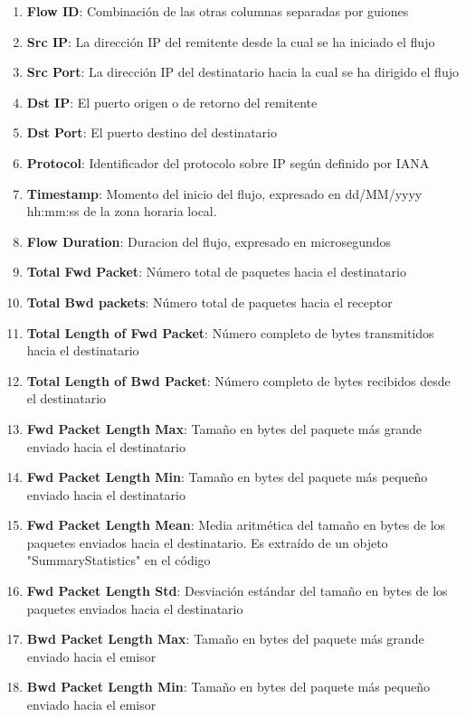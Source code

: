 \begin{enumerate}
    \item \textbf{Flow ID}: Combinación de las otras columnas separadas por guiones
    \item \textbf{Src IP}: La dirección IP del remitente desde la cual se ha iniciado el flujo
    \item \textbf{Src Port}: La dirección IP del destinatario hacia la cual se ha dirigido el flujo
    \item \textbf{Dst IP}: El puerto origen o de retorno del remitente
    \item \textbf{Dst Port}: El puerto destino del destinatario
    \item \textbf{Protocol}: Identificador del protocolo sobre IP según definido por IANA \cite{ipprotocolnumbers}
    \item \textbf{Timestamp}: Momento del inicio del flujo, expresado en dd/MM/yyyy hh:mm:ss de la zona horaria local.
    \item \textbf{Flow Duration}: Duracion del flujo, expresado en microsegundos
    \item \textbf{Total Fwd Packet}: Número total de paquetes hacia el destinatario
    \item \textbf{Total Bwd packets}: Número total de paquetes hacia el receptor
    \item \textbf{Total Length of Fwd Packet}: Número completo de bytes transmitidos hacia el destinatario
    \item \textbf{Total Length of Bwd Packet}: Número completo de bytes recibidos desde el destinatario
    \item \textbf{Fwd Packet Length Max}: Tamaño en bytes del paquete más grande enviado hacia el destinatario
    \item \textbf{Fwd Packet Length Min}: Tamaño en bytes del paquete más pequeño enviado hacia el destinatario
    \item \textbf{Fwd Packet Length Mean}: Media aritmética del tamaño en bytes de los paquetes enviados hacia el destinatario. Es extraído de un objeto "SummaryStatistics" en el código
    \item \textbf{Fwd Packet Length Std}: Desviación estándar del tamaño en bytes de los paquetes enviados hacia el destinatario
    \item \textbf{Bwd Packet Length Max}: Tamaño en bytes del paquete más grande enviado hacia el emisor
    \item \textbf{Bwd Packet Length Min}: Tamaño en bytes del paquete más pequeño enviado hacia el emisor

\end{enumerate}
